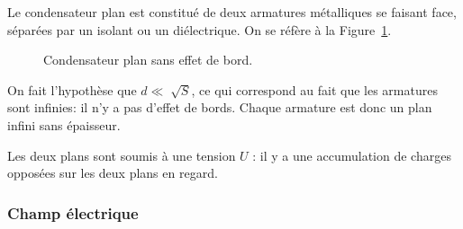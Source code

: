             Le condensateur plan est constitué de deux armatures métalliques se faisant face, séparées par un isolant ou un diélectrique. On se réfère à la Figure~\ref{fig:condensateur_plan_sans_effet_de_bord}.
            \begin{figure}
                \centering
                \caption{Condensateur plan sans effet de bord.}    
                \label{fig:condensateur_plan_sans_effet_de_bord}
            \end{figure} 

            On fait l'hypothèse que $d\ll\sqrt[]{S}$, ce qui correspond au fait que les armatures sont \og infinies\fg : il n'y a pas d'effet de bords. Chaque armature est donc un plan infini sans épaisseur.

            Les deux plans sont soumis à une tension $U$ : il y a une accumulation de charges opposées sur les deux plans en regard.

        \subsubsection{Champ électrique}

